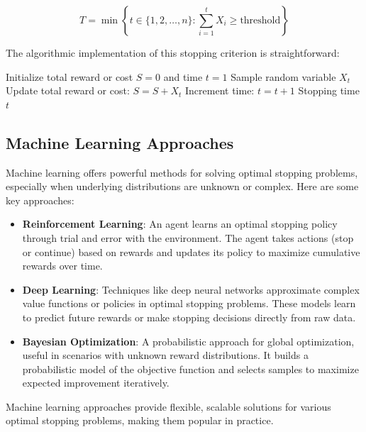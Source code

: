 \documentclass[12pt]{book} %
\begin{document}
\[
T = \min \left\{ t \in \{1, 2, \ldots, n\} : \sum_{i=1}^{t} X_i \geq \text{threshold} \right\}
\]

The algorithmic implementation of this stopping criterion is straightforward:
\FloatBarrier
\begin{algorithm}
\caption{Threshold-Based Stopping Criterion}
\begin{algorithmic}[1]
\State Initialize total reward or cost \(S = 0\) and time \(t = 1\)
    \State Sample random variable \(X_t\)
    \State Update total reward or cost: \(S = S + X_t\)
    \State Increment time: \(t = t + 1\)
\EndWhile
\Return Stopping time \(t\)
\end{algorithmic}
\end{algorithm}

\subsection{Machine Learning Approaches}

Machine learning offers powerful methods for solving optimal stopping problems, especially when underlying distributions are unknown or complex. Here are some key approaches:

\begin{itemize}
    \item \textbf{Reinforcement Learning}: An agent learns an optimal stopping policy through trial and error with the environment. The agent takes actions (stop or continue) based on rewards and updates its policy to maximize cumulative rewards over time.
    
    \item \textbf{Deep Learning}: Techniques like deep neural networks approximate complex value functions or policies in optimal stopping problems. These models learn to predict future rewards or make stopping decisions directly from raw data.
    
    \item \textbf{Bayesian Optimization}: A probabilistic approach for global optimization, useful in scenarios with unknown reward distributions. It builds a probabilistic model of the objective function and selects samples to maximize expected improvement iteratively.
\end{itemize}

Machine learning approaches provide flexible, scalable solutions for various optimal stopping problems, making them popular in practice.
\end{document}
